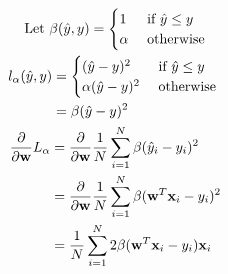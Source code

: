\documentclass{introtosml}
\begin{document}
\begin{p}
  \item
    \begin{gather*}
      \text{Let} \beta(\hat{y}, y) = \begin{cases}
        1 & \mif \hat{y} \le y \\
        \alpha & \otherwise
      \end{cases} \\
      \begin{aligned}
        l_\alpha (\hat{y}, y)
        & = \begin{cases}
          (\hat{y} - y)^2 & \mif \hat{y} \le y \\
          \alpha (\hat{y} - y)^2 & \otherwise
        \end{cases} \\
        & = \beta (\hat{y} - y)^2
      \end{aligned} \\
      \begin{aligned}
        \frac{\partial}{\partial \vec{w}} L_\alpha
        & = \frac{\partial}{\partial \vec{w}}
            \frac{1}{N} \sum_{i=1}^N \beta (\hat{y}_i - y_i)^2 \\
        & = \frac{\partial}{\partial \vec{w}}
            \frac{1}{N} \sum_{i=1}^N \beta (\vec{w}^T \vec{x}_i - y_i)^2 \\
        & = \frac{1}{N} \sum_{i=1}^N 2 \beta (\vec{w}^T \vec{x}_i - y_i) \vec{x}_i \\
      \end{aligned}
    \end{gather*}
\end{p}
\end{document}
